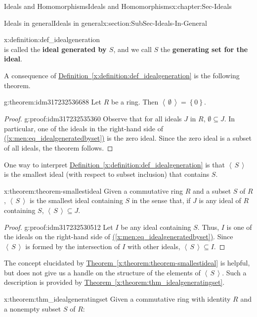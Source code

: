 \documentclass[oneside,10pt,]{book}
\newcommand{\xreffont}{\relax}
\newcommand{\terminology}[1]{\textbf{#1}}
\numberwithin{equation}{section}
\newcommand{\ideal}[1]{\left\langle\, #1 \,\right\rangle}
\newcommand{\set}[1]{\left\{ {#1} \right\}}
\begin{document}
\begin{chapterptx}{Ideals and Homomorphisms}{}{Ideals and Homomorphisms}{}{}{x:chapter:Sec-Ideals}
\begin{sectionptx}{Ideals in general}{}{Ideals in general}{}{}{x:section:SubSec-Ideals-In-General}
\begin{definition}{}{x:definition:def_idealgeneration}
\begin{equation}
\end{equation}
is called the \terminology{ideal generated by \(S\)}, and we call \(S\) the \terminology{generating set for the ideal}.%
\end{definition}
A consequence of \hyperref[x:definition:def_idealgeneration]{Definition~{\xreffont\ref{x:definition:def_idealgeneration}}} is the following theorem.%
\begin{theorem}{}{}{g:theorem:idm317232536688}%
Let \(R\) be a ring. Then \(\ideal{\emptyset} = \set{0}\).\end{theorem}
\begin{proof}{}{g:proof:idm317232535360}
Observe that for all ideals \(J\) in \(R\), \(\emptyset\subseteq J\). In particular, one of the ideals in the right-hand side of \hyperref[x:men:eq_idealgeneratedbyset]{({\xreffont\ref{x:men:eq_idealgeneratedbyset}})} is the zero ideal. Since the zero ideal is a subset of all ideals, the theorem follows.%
\end{proof}
One way to interpret \hyperref[x:definition:def_idealgeneration]{Definition~{\xreffont\ref{x:definition:def_idealgeneration}}} is that \(\ideal{S}\) is the smallest ideal (with respect to subset inclusion) that contains \(S\).%
\begin{theorem}{}{}{x:theorem:theorem-smallestideal}%
Given a commutative ring \(R\) and a subset \(S\) of \(R\), \(\ideal{S}\) is the smallest ideal containing \(S\) in the sense that, if \(J\) is any ideal of \(R\) containing \(S\), \(\ideal{S}\subseteq J\).%
\end{theorem}
\begin{proof}{}{g:proof:idm317232530512}
Let \(I\) be any ideal containing \(S\). Thus, \(I\) is one of the ideals on the right-hand side of \hyperref[x:men:eq_idealgeneratedbyset]{({\xreffont\ref{x:men:eq_idealgeneratedbyset}})}. Since \(\ideal{S}\) is formed by the intersection of \(I\) with other ideals, \(\ideal{S}\subseteq I\).%
\end{proof}
The concept elucidated by \hyperref[x:theorem:theorem-smallestideal]{Theorem~{\xreffont\ref{x:theorem:theorem-smallestideal}}} is helpful, but does not give us a handle on the structure of the elements of \(\ideal{S}\). Such a description is provided by \hyperref[x:theorem:thm_idealgeneratingset]{Theorem~{\xreffont\ref{x:theorem:thm_idealgeneratingset}}}.%
\begin{theorem}{}{}{x:theorem:thm_idealgeneratingset}%
Given a commutative ring with identity \(R\) and a nonempty subset \(S\) of \(R\):%

\end{theorem}
\end{sectionptx}
\end{chapterptx}
\end{document}
